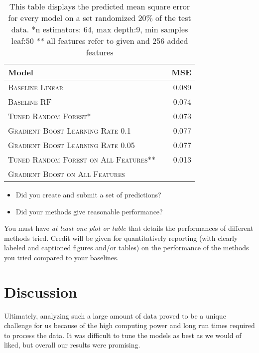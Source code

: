 \documentclass[11pt]{article}
\begin{document}
\begin{table}
	\centering
	\begin{tabular}{llr}
		\toprule
		Model &  & MSE \\
		\midrule
		\textsc{Baseline Linear} & & 0.089\\
		\textsc{Baseline RF} & & 0.074 \\
		\textsc{Tuned Random Forest*} & &0.073   \\
		\textsc{Gradient Boost Learning Rate 0.1} & & 0.077\\
		\textsc{Gradient Boost Learning Rate 0.05} & & 0.077\\
		\textsc{Tuned Random Forest on All Features**} && 0.013\\
		\textsc{Gradient Boost on All Features} &&
		\bottomrule
	\end{tabular}
	\caption{\label{tab:results} This table displays the predicted mean square error for every model on a set randomized $20\%$ of the test data. *n estimators: $64$, max depth:$9$, min samples leaf:$50$ ** all features refer to given and 256 added features}
\end{table}

\begin{itemize}
\item Did you create and submit a set of
  predictions? 
  

\item  Did your methods give reasonable performance?  
\end{itemize}

\noindent You must have \textit{at least one plot or table}
that details the performances of different methods tried. 
Credit will be given for quantitatively reporting (with clearly
labeled and captioned figures and/or tables) on the performance of the
methods you tried compared to your baselines.








\section{Discussion} 

Ultimately, analyzing such a large amount of data proved to be a unique challenge for us because of the high computing power and long run times required to process the data. It was difficult to tune the models as best as we would of liked, but overall our results were promising.
 
\end{document}
